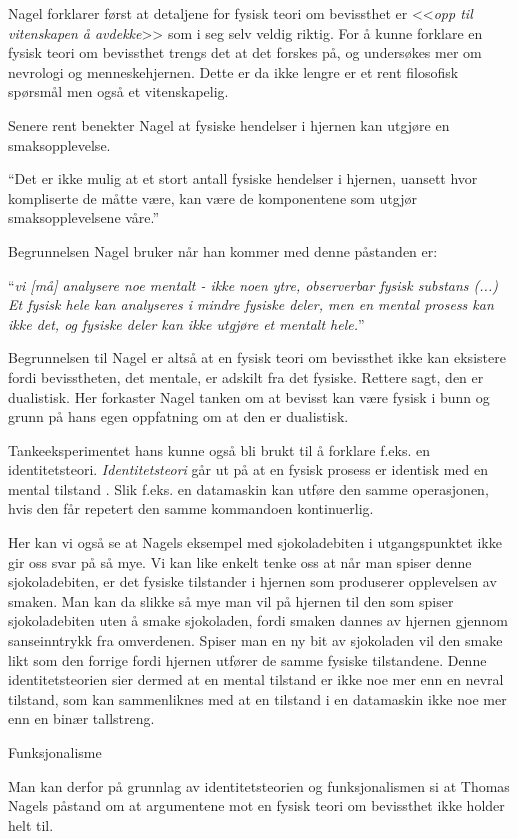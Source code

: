 Nagel forklarer først at detaljene for fysisk teori om bevissthet er <<\emph{opp til vitenskapen å avdekke}>> som i seg selv veldig riktig.
For å kunne forklare en fysisk teori om bevissthet trengs det at det forskes på,
og undersøkes mer om nevrologi og menneskehjernen. Dette er da ikke lengre er et rent filosofisk spørsmål men også et vitenskapelig.

Senere rent benekter Nagel at fysiske hendelser i hjernen kan utgjøre en smaksopplevelse.
\begin{pquotation}{\cite[36]{Nagel2003}}
    ``Det er ikke mulig at et stort antall fysiske hendelser i hjernen,
uansett hvor kompliserte de måtte være, 
kan være de komponentene som utgjør smaksopplevelsene våre.''
\end{pquotation}
Begrunnelsen Nagel bruker når han kommer med denne påstanden er:
\begin{pquotation}{\cite[36]{Nagel2003}}
``\textit{vi [må] analysere noe mentalt - ikke noen ytre, observerbar fysisk substans (...) 
Et fysisk hele kan analyseres i mindre fysiske deler, men en
mental prosess kan ikke det, og fysiske deler kan ikke utgjøre et mentalt hele.}''
\end{pquotation}
Begrunnelsen til Nagel er altså at en fysisk teori om bevissthet ikke kan eksistere fordi bevisstheten, 
det mentale, er adskilt fra det fysiske. Rettere sagt, den er dualistisk. 
Her forkaster Nagel tanken om at bevisst kan være fysisk i bunn og grunn på hans egen oppfatning om at den er dualistisk.

Tankeeksperimentet hans kunne også bli brukt til å forklare f.eks. en identitetsteori.
\textit{Identitetsteori} går ut på at en fysisk prosess er identisk med en mental tilstand \autocite{snl:identitetsteori}.
Slik f.eks. en datamaskin kan utføre den samme operasjonen,
hvis den får repetert den samme kommandoen kontinuerlig.

Her kan vi også se at Nagels eksempel med sjokoladebiten i utgangspunktet 
ikke gir oss svar på så mye.
Vi kan like enkelt tenke oss at når man spiser denne sjokoladebiten,
er det fysiske tilstander i hjernen som produserer opplevelsen av smaken. 
Man kan da slikke så mye man vil på hjernen til den som spiser sjokoladebiten 
uten å smake sjokoladen, fordi smaken dannes av hjernen gjennom sanseinntrykk fra omverdenen.
Spiser man en ny bit av sjokoladen vil den smake likt som den forrige fordi hjernen 
utfører de samme fysiske tilstandene.
Denne identitetsteorien sier dermed at en mental tilstand er ikke noe mer enn en nevral tilstand,
som kan sammenliknes med at en tilstand i en datamaskin ikke noe mer enn en binær tallstreng.

Funksjonalisme 

Man kan derfor på grunnlag av identitetsteorien og funksjonalismen si at 
Thomas Nagels påstand om at argumentene mot en fysisk teori om bevissthet ikke holder helt til.